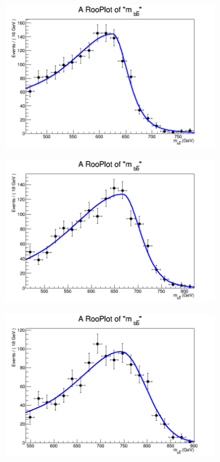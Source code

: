 \begin{figure}[phtb!]
\begin{center}
  \begin{subfigure}[$m_{A}=650$ GeV]{0.4\textwidth}\includegraphics[width=\textwidth]{FitResults/images/fitMC_bAbb650_4.png}\end{subfigure}
  \begin{subfigure}[$m_{A}=700$ GeV]{0.4\textwidth}\includegraphics[width=\textwidth]{FitResults/images/fitMC_bAbb700_4.png}\end{subfigure}
  \begin{subfigure}[$m_{A}=800$ GeV]{0.4\textwidth}\includegraphics[width=\textwidth]{FitResults/images/fitMC_bAbb800_4.png}\end{subfigure}

\end{center}
\end{figure}
